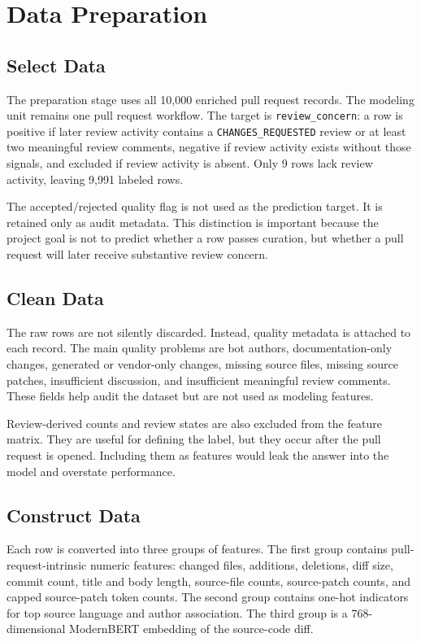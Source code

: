 \section{Data Preparation}

\subsection{Select Data}

The preparation stage uses all 10,000 enriched pull request records. The modeling unit remains one pull request workflow. The target is \texttt{review\_concern}: a row is positive if later review activity contains a \texttt{CHANGES\_REQUESTED} review or at least two meaningful review comments, negative if review activity exists without those signals, and excluded if review activity is absent. Only 9 rows lack review activity, leaving 9,991 labeled rows.

The accepted/rejected quality flag is not used as the prediction target. It is retained only as audit metadata. This distinction is important because the project goal is not to predict whether a row passes curation, but whether a pull request will later receive substantive review concern.

\subsection{Clean Data}

The raw rows are not silently discarded. Instead, quality metadata is attached to each record. The main quality problems are bot authors, documentation-only changes, generated or vendor-only changes, missing source files, missing source patches, insufficient discussion, and insufficient meaningful review comments. These fields help audit the dataset but are not used as modeling features.

Review-derived counts and review states are also excluded from the feature matrix. They are useful for defining the label, but they occur after the pull request is opened. Including them as features would leak the answer into the model and overstate performance.

\subsection{Construct Data}

Each row is converted into three groups of features. The first group contains pull-request-intrinsic numeric features: changed files, additions, deletions, diff size, commit count, title and body length, source-file counts, source-patch counts, and capped source-patch token counts. The second group contains one-hot indicators for top source language and author association. The third group is a 768-dimensional ModernBERT embedding of the source-code diff.

